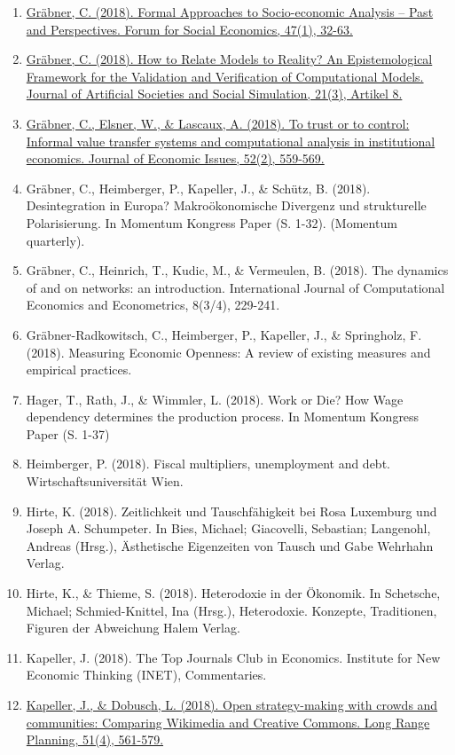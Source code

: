 \begin{enumerate}
	 \item \href{https://doi.org/10.1080/07360932.2015.1042491}{Gräbner, C. (2018). Formal Approaches to Socio-economic Analysis -- Past and Perspectives. Forum for Social Economics, 47(1), 32-63.}
	 \item \href{https://doi.org/10.18564/jasss.3772}{Gräbner, C. (2018). How to Relate Models to Reality? An Epistemological Framework for the Validation and Verification of Computational Models. Journal of Artificial Societies and Social Simulation, 21(3), Artikel 8.}
	 \item \href{https://doi.org/10.1080/00213624.2018.1469936}{Gräbner, C., Elsner, W., \& Lascaux, A. (2018). To trust or to control: Informal value transfer systems and computational analysis in institutional economics. Journal of Economic Issues, 52(2), 559-569.}
	 \item Gräbner, C., Heimberger, P., Kapeller, J., \& Schütz, B. (2018). Desintegration in Europa? Makroökonomische Divergenz und strukturelle Polarisierung. In Momentum Kongress Paper (S. 1-32). (Momentum quarterly).
	 \item Gräbner, C., Heinrich, T., Kudic, M., \& Vermeulen, B. (2018). The dynamics of and on networks: an introduction. International Journal of Computational Economics and Econometrics, 8(3/4), 229-241.
	 \item Gräbner-Radkowitsch, C., Heimberger, P., Kapeller, J., \& Springholz, F. (2018). Measuring Economic Openness: A review of existing measures and empirical practices.
	 \item Hager, T., Rath, J., \& Wimmler, L. (2018). Work or Die? How Wage dependency determines the production process. In Momentum Kongress Paper (S. 1-37)
	 \item Heimberger, P. (2018). Fiscal multipliers, unemployment and debt. Wirtschaftsuniversität Wien.
	 \item Hirte, K. (2018). Zeitlichkeit und Tauschfähigkeit bei Rosa Luxemburg und Joseph A. Schumpeter. In Bies, Michael; Giacovelli, Sebastian; Langenohl, Andreas (Hrsg.), Ästhetische Eigenzeiten von Tausch und Gabe Wehrhahn Verlag.
	 \item Hirte, K., \& Thieme, S. (2018). Heterodoxie in der Ökonomik. In Schetsche, Michael; Schmied-Knittel, Ina (Hrsg.), Heterodoxie. Konzepte, Traditionen, Figuren der Abweichung Halem Verlag.
	 \item Kapeller, J. (2018). The Top Journals Club in Economics. Institute for New Economic Thinking (INET), Commentaries.
	 \item \href{https://doi.org/10.1016/j.lrp.2017.08.005}{Kapeller, J., \& Dobusch, L. (2018). Open strategy-making with crowds and communities: Comparing Wikimedia and Creative Commons. Long Range Planning, 51(4), 561-579.}

\end{enumerate}
